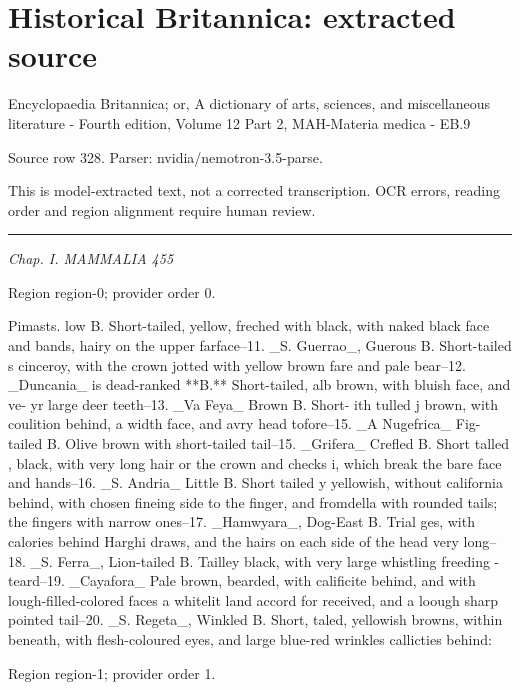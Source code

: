 \documentclass[11pt]{article}
\begin{document}
\section*{Historical Britannica: extracted source}
Encyclopaedia Britannica; or, A dictionary of arts, sciences, and miscellaneous literature - Fourth edition, Volume 12 Part 2, MAH-Materia medica - EB.9\par
{\small Source row 328. Parser: nvidia/nemotron-3.5-parse.\par}
{\small This is model-extracted text, not a corrected transcription. OCR errors, reading order and region alignment require human review.\par}
\hrule\medskip
{\small\itshape Chap. I. MAMMALIA 455\par}

{\scriptsize\color{gray} Region region-0; provider order 0.\par}
\medskip

Pimasts. low B. Short-tailed, yellow, freched with black, with naked black face and bands, hairy on the upper farface--11. \_S. Guerrao\_, Guerous B. Short-tailed s cinceroy, with the crown jotted with yellow brown fare and pale bear--12. \_Duncania\_ is dead-ranked **B.** Short-tailed, alb brown, with bluish face, and ve- yr large deer teeth--13. \_Va Feya\_ Brown B. Short- ith tulled j brown, with coulition behind, a width face, and avry head tofore--15. \_A Nugefrica\_ Fig-tailed B. Olive brown with short-tailed tail--15. \_Grifera\_ Crefled B. Short talled , black, with very long hair or the crown and checks i, which break the bare face and hands--16. \_S. Andria\_ Little B. Short tailed y yellowish, without california behind, with chosen fineing side to the finger, and fromdella with rounded tails; the fingers with narrow ones--17. \_Hamwyara\_, Dog-East B. Trial ges, with calories behind Harghi draws, and the hairs on each side of the head very long--18. \_S. Ferra\_, Lion-tailed B. Tailley black, with very large whistling freeding -teard--19. \_Cayafora\_ Pale brown, bearded, with calificite behind, and with lough-filled-colored faces a whitelit land accord for received, and a loough sharp pointed tail--20. \_S. Regeta\_, Winkled B. Short, taled, yellowish browns, within beneath, with flesh-coloured eyes, and large blue-red wrinkles callicties behind:
\par

{\scriptsize\color{gray} Region region-1; provider order 1.\par}
\medskip
\end{document}
